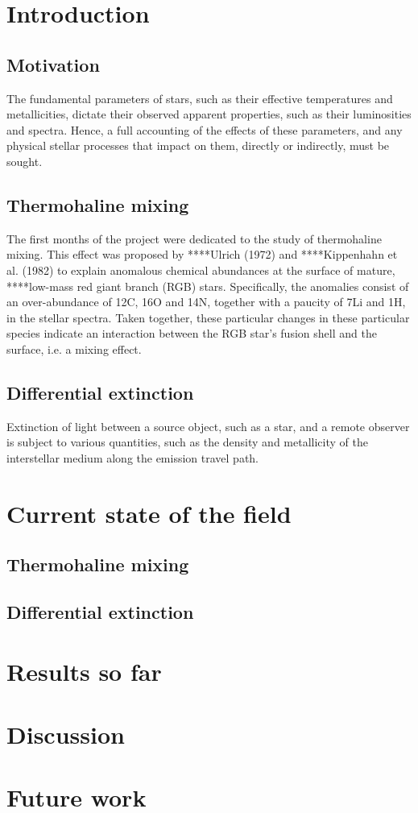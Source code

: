 \documentclass{mnras}
\begin{document}
\section{Introduction}
\subsection{Motivation}
The fundamental parameters of stars, such as their effective temperatures and metallicities, dictate their observed apparent properties, such as their luminosities and spectra. Hence, a full accounting of the effects of these parameters, and any physical stellar processes that impact on them, directly or indirectly, must be sought.

\subsection{Thermohaline mixing}
The first months of the project were dedicated to the study of thermohaline mixing. This effect was proposed by ****Ulrich (1972) and ****Kippenhahn et al. (1982) to explain anomalous chemical abundances at the surface of mature, ****low-mass red giant branch (RGB) stars. Specifically, the anomalies consist of an over-abundance of 12C, 16O and 14N, together with a paucity of 7Li and 1H, in the stellar spectra. Taken together, these particular changes in these particular species indicate an interaction between the RGB star's fusion shell and the surface, i.e. a mixing effect.

\subsection{Differential extinction}
Extinction of light between a source object, such as a star, and a remote observer is subject to various quantities, such as the density and metallicity of the interstellar medium along the emission travel path.

\section{Current state of the field}
\subsection{Thermohaline mixing}

\subsection{Differential extinction}

\section{Results so far}

\section{Discussion}

\section{Future work}
\end{document}
